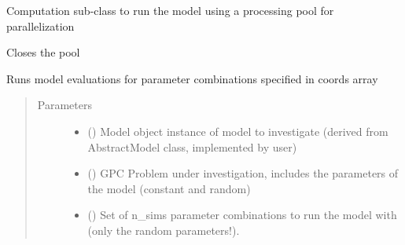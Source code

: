 \documentclass[letterpaper,10pt,english,openany,oneside]{sphinxmanual}
\begin{document}

\begin{fulllineitems}
\label{\detokenize{pygpc:pygpc.Computation.ComputationPoolMap}}
Computation sub-class to run the model using a processing pool for parallelization

\begin{fulllineitems}
\label{\detokenize{pygpc:pygpc.Computation.ComputationPoolMap.close}}
Closes the pool

\end{fulllineitems}


\begin{fulllineitems}
\label{\detokenize{pygpc:pygpc.Computation.ComputationPoolMap.run}}
Runs model evaluations for parameter combinations specified in coords array
\begin{quote}\begin{description}
\item[{Parameters}] \leavevmode\begin{itemize}
\item {} 
 () \textendash{} Model object instance of model to investigate (derived from AbstractModel class, implemented by user)

\item {} 
 () \textendash{} GPC Problem under investigation, includes the parameters of the model (constant and random)

\item {} 
 (\sphinxstyleliteralemphasis{\sphinxupquote{ {[}}}\sphinxstyleliteralemphasis{\sphinxupquote{, }}\sphinxstyleliteralemphasis{\sphinxupquote{{]}}}) \textendash{} Set of n\_sims parameter combinations to run the model with (only the random parameters!).


\end{itemize}
\end{description}
\end{quote}
\end{fulllineitems}
\end{fulllineitems}
\end{document}
